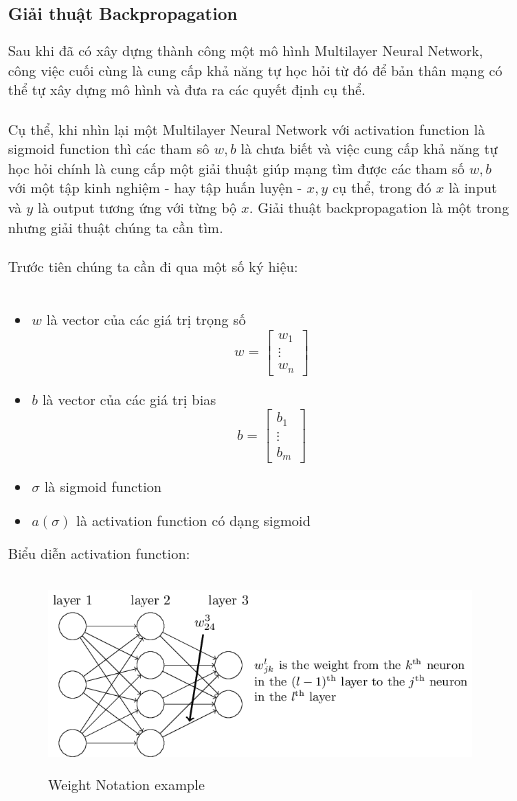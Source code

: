 \subsubsection{Giải thuật Backpropagation}
Sau khi đã có xây dựng thành công một mô hình Multilayer Neural Network, công 
việc cuối cùng là cung cấp khả năng tự học hỏi từ đó để bản thân mạng có thể 
tự xây dựng mô hình và đưa ra các quyết định cụ thể.\\\\
Cụ thể, khi nhìn lại một Multilayer Neural Network với activation function là 
sigmoid function thì các tham sô $w, b$ là chưa biết và việc cung cấp khả năng 
tự học hỏi chính là cung cấp một giải thuật giúp mạng tìm được các tham số 
$w, b$ với một tập kinh nghiệm - hay tập huấn luyện - ${x, y}$ cụ thể, trong 
đó $x$ là input và $y$ là output tương ứng với từng bộ $x$. Giải thuật backpropagation 
là một trong nhưng giải thuật chúng ta cần tìm.\\\\
Trước tiên chúng ta cần đi qua một số ký hiệu:\\\\
\begin{itemize}
\item $w$ là vector của các giá trị trọng số\\ 
\[ w =
\begin{bmatrix}
w_1\\
\vdots\\
w_n
\end{bmatrix}
\]
\item $b$ là vector của các giá trị bias\\ 
\[ b =
\begin{bmatrix}
b_1\\
\vdots\\
b_m
\end{bmatrix}
\]
\item $\sigma$ là sigmoid function
\item $a(\sigma)$ là activation function có dạng sigmoid
\end{itemize}
Biểu diễn activation function:\\
\begin{figure}[h!]
\centering
\includegraphics[height=2in, keepaspectratio=true]{exw.png}
\caption{Weight Notation example}
\end{figure}\\
